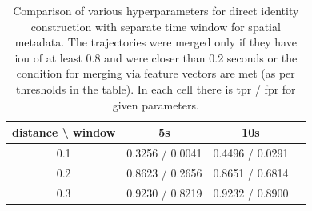 \begin{table}[]
    \centering
    \begin{tabular}{c||c|c|c}
     distance \textbackslash{} window & 5s & 10s \\ \hline \hline
     0.1 & 0.3256 / 0.0041 & 0.4496 / 0.0291  \\ \hline
     0.2 & 0.8623 / 0.2656 & 0.8651 / 0.6814 \\ \hline
     0.3 & 0.9230 / 0.8219 & 0.9232 / 0.8900
    \end{tabular}
    \caption[Comparison of various hyperparameters for direct identity construction with separate time window for spatial metadata]{Comparison of various hyperparameters for direct identity construction with separate time window for spatial metadata. The trajectories were merged only if they have \gls{iou} of at least 0.8 and were closer than 0.2 seconds or the condition for merging via feature vectors are met (as per thresholds in the table). In each cell there is \gls{tpr} / \gls{fpr} for given parameters.}
    \label{tab:direct_time_window}
\end{table}